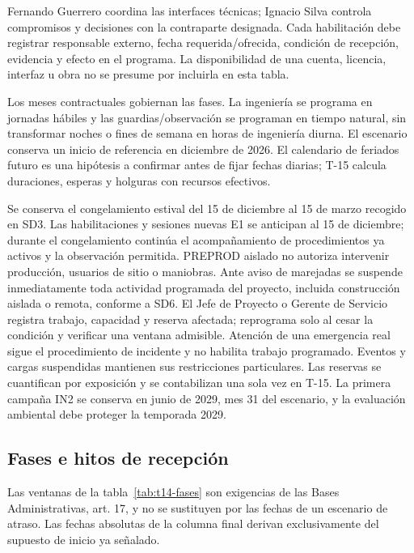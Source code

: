 Fernando Guerrero coordina las interfaces técnicas; Ignacio Silva controla compromisos y decisiones con la contraparte designada. Cada habilitación debe registrar responsable externo, fecha requerida/ofrecida, condición de recepción, evidencia y efecto en el programa. La disponibilidad de una cuenta, licencia, interfaz u obra no se presume por incluirla en esta tabla.

Los meses contractuales gobiernan las fases. La ingeniería se programa en jornadas hábiles y las guardias/observación se programan en tiempo natural, sin transformar noches o fines de semana en horas de ingeniería diurna. El escenario conserva un inicio de referencia en diciembre de 2026. El calendario de feriados futuro es una hipótesis a confirmar antes de fijar fechas diarias; T-15 calcula duraciones, esperas y holguras con recursos efectivos.

Se conserva el congelamiento estival del 15 de diciembre al 15 de marzo recogido en SD3. Las habilitaciones y sesiones nuevas E1 se anticipan al 15 de diciembre; durante el congelamiento continúa el acompañamiento de procedimientos ya activos y la observación permitida. PREPROD aislado no autoriza intervenir producción, usuarios de sitio o maniobras. Ante aviso de marejadas se suspende inmediatamente toda actividad programada del proyecto, incluida construcción aislada o remota, conforme a SD6. El Jefe de Proyecto o Gerente de Servicio registra trabajo, capacidad y reserva afectada; reprograma solo al cesar la condición y verificar una ventana admisible. Atención de una emergencia real sigue el procedimiento de incidente y no habilita trabajo programado. Eventos y cargas suspendidas mantienen sus restricciones particulares. Las reservas se cuantifican por exposición y se contabilizan una sola vez en T-15. La primera campaña IN2 se conserva en junio de 2029, mes 31 del escenario, y la evaluación ambiental debe proteger la temporada 2029.

\subsection{Fases e hitos de recepción}
Las ventanas de la tabla~\ref{tab:t14-fases} son exigencias de las Bases Administrativas, art. 17, y no se sustituyen por las fechas de un escenario de atraso. Las fechas absolutas de la columna final derivan exclusivamente del supuesto de inicio ya señalado.

